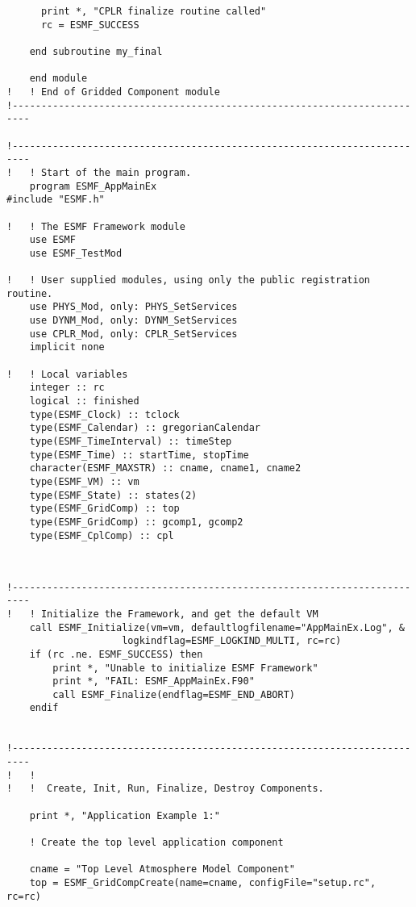 \begin{verbatim}
      print *, "CPLR finalize routine called"
      rc = ESMF_SUCCESS

    end subroutine my_final

    end module
!   ! End of Gridded Component module
!-------------------------------------------------------------------------

!-------------------------------------------------------------------------
!   ! Start of the main program.
    program ESMF_AppMainEx
#include "ESMF.h"
    
!   ! The ESMF Framework module
    use ESMF
    use ESMF_TestMod
    
!   ! User supplied modules, using only the public registration routine.
    use PHYS_Mod, only: PHYS_SetServices
    use DYNM_Mod, only: DYNM_SetServices
    use CPLR_Mod, only: CPLR_SetServices
    implicit none
    
!   ! Local variables
    integer :: rc
    logical :: finished
    type(ESMF_Clock) :: tclock
    type(ESMF_Calendar) :: gregorianCalendar
    type(ESMF_TimeInterval) :: timeStep
    type(ESMF_Time) :: startTime, stopTime
    character(ESMF_MAXSTR) :: cname, cname1, cname2
    type(ESMF_VM) :: vm
    type(ESMF_State) :: states(2)
    type(ESMF_GridComp) :: top
    type(ESMF_GridComp) :: gcomp1, gcomp2
    type(ESMF_CplComp) :: cpl
        
 
\end{verbatim}
 

 \begin{verbatim}
!-------------------------------------------------------------------------
!   ! Initialize the Framework, and get the default VM
    call ESMF_Initialize(vm=vm, defaultlogfilename="AppMainEx.Log", &
                    logkindflag=ESMF_LOGKIND_MULTI, rc=rc)
    if (rc .ne. ESMF_SUCCESS) then
        print *, "Unable to initialize ESMF Framework"
        print *, "FAIL: ESMF_AppMainEx.F90"
        call ESMF_Finalize(endflag=ESMF_END_ABORT)
    endif


!-------------------------------------------------------------------------
!   !
!   !  Create, Init, Run, Finalize, Destroy Components.
 
    print *, "Application Example 1:"

    ! Create the top level application component

    cname = "Top Level Atmosphere Model Component"
    top = ESMF_GridCompCreate(name=cname, configFile="setup.rc", rc=rc)  
 
\end{verbatim}
 
